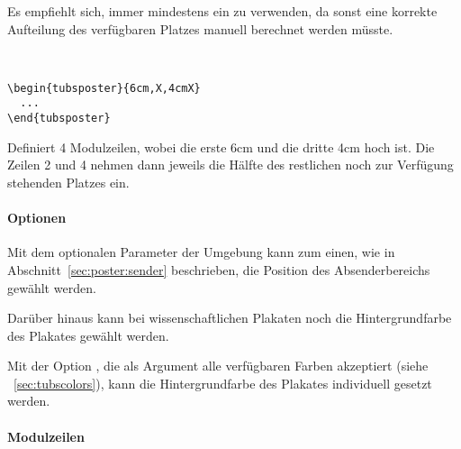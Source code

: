 \begin{hint}
Es empfiehlt sich, immer mindestens ein  zu verwenden, da sonst
eine korrekte Aufteilung des verfügbaren Platzes manuell berechnet werden
müsste.
\end{hint}


\begin{minipage}{0.6\textwidth}
\begin{example}~\par
  \begin{lstlisting}
\begin{tubsposter}{6cm,X,4cmX}
  ...
\end{tubsposter}
  \end{lstlisting}

  \noindent Definiert 4 Modulzeilen, wobei die erste 6cm und die dritte 4cm hoch ist.
  Die Zeilen 2 und 4 nehmen dann jeweils die Hälfte des restlichen 
  noch zur Verfügung stehenden Platzes ein.
\end{example}
\end{minipage}
\hfill
\begin{minipage}{0.3\textwidth}\centering
\end{minipage}

\paragraph{Optionen}

Mit dem optionalen Parameter der Umgebung 
kann zum einen, wie in Abschnitt~\ref{sec:poster:sender} beschrieben,
die Position des Absenderbereichs gewählt werden.

Darüber hinaus kann bei wissenschaftlichen Plakaten noch die
Hintergrundfarbe des Plakates gewählt werden.

\begin{Declaration}
\end{Declaration}

Mit der Option , die als Argument alle verfügbaren
Farben akzeptiert (siehe \chaptername~\ref{sec:tubscolors}), kann die
Hintergrundfarbe des Plakates individuell gesetzt werden.

\paragraph{Modulzeilen}~\par

